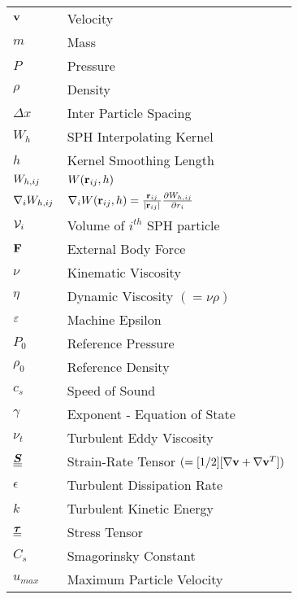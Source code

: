 \begin{longtable}{ll}
$\vect{v}$           & Velocity                          \\
$m$                  & Mass                              \\
$P$                  & Pressure                          \\
$\rho$               & Density                           \\
$\Delta x$           & Inter Particle Spacing            \\
$W_{h}$              & SPH Interpolating Kernel          \\
$h$                  & Kernel Smoothing Length           \\
$\WIJ$               & $W(\RIJ, h)$                      \\
$\DWIJ$                        & $\nabla_i W(\RIJ,h) = \frac{\RIJ}{\RtwoIJ[]} \PartialDerivative[r_i]{\WIJ}$                 \\
$\Vol_i$             & Volume of $i^{th}$ SPH particle   \\
$\vect{F}$           & External Body Force               \\
$\nu$                & Kinematic Viscosity               \\
$\eta$               & Dynamic Viscosity $(=\nu \rho)$   \\
$\MachineEpsilon$    & Machine Epsilon                   \\
$P_0$                & Reference Pressure                \\
$\rho_0$             & Reference Density                 \\
$c_s$                & Speed of Sound                    \\
$\gamma$             & Exponent - Equation of State      \\
$\nu_t$              & Turbulent Eddy Viscosity          \\
$\tensor{S}$                   & Strain-Rate Tensor $(=[1/2][\nabla \vect{v} + \nabla \vect{v}^T])$                          \\
$\epsilon$           & Turbulent Dissipation Rate        \\
$k$                  & Turbulent Kinetic Energy          \\
$\tensor{\tau}$      & Stress Tensor                     \\
$C_s $               & Smagorinsky Constant              \\
$u_{max}$            & Maximum Particle Velocity        
\end{longtable}